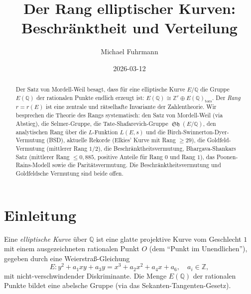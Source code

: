 \documentclass[12pt,a4paper]{amsart}
\theoremstyle{definition}
\theoremstyle{remark}
\newcommand{\Z}{\mathbb{Z}}
\newcommand{\Q}{\mathbb{Q}}
\DeclareMathOperator{\Sha}{\mathfrak{Sh}}
\begin{document}

\title{Der Rang elliptischer Kurven:\\
  Beschränktheit und Verteilung}

\author{Michael Fuhrmann}
\address{Specialist Mathematics Project, Build 167}
\date{2026-03-12}

\begin{abstract}
Der Satz von Mordell-Weil besagt, dass für eine elliptische Kurve $E/\Q$ die Gruppe
$E(\Q)$ der rationalen Punkte endlich erzeugt ist:
$E(\Q) \cong \Z^r \oplus E(\Q)_{\mathrm{tors}}$.
Der \emph{Rang} $r = r(E)$ ist eine zentrale und rätselhafte Invariante der
Zahlentheorie.
Wir besprechen die Theorie des Rangs systematisch: den Satz von Mordell-Weil (via
Abstieg), die Selmer-Gruppe, die Tate-Shafarevich-Gruppe $\Sha(E/\Q)$, den analytischen
Rang über die $L$-Funktion $L(E,s)$ und die Birch-Swinnerton-Dyer-Vermutung (BSD),
aktuelle Rekorde (Elkies' Kurve mit Rang $\geq 29$), die Goldfeld-Vermutung
(mittlerer Rang $1/2$), die Beschränktheitsver\-mutung, Bhargava-Shankars Satz
(mittlerer Rang $\leq 0{,}885$, positive Anteile für Rang $0$ und Rang $1$),
das Poonen-Rains-Modell sowie die Paritätsvermutung.
Die Beschränktheitsvermutung und Goldfeldsche Vermutung sind beide offen.
\end{abstract}

\maketitle

\tableofcontents

\section{Einleitung}

Eine \emph{elliptische Kurve} über $\Q$ ist eine glatte projektive Kurve vom Geschlecht
$1$ mit einem ausgezeichneten rationalen Punkt $O$ (dem ``Punkt im Unendlichen''),
gegeben durch eine Weierstraß-Gleichung
\[
  E\colon y^2 + a_1 xy + a_3 y = x^3 + a_2 x^2 + a_4 x + a_6, \quad a_i \in \Z,
\]
mit nicht-verschwindender Diskriminante.
Die Menge $E(\Q)$ der rationalen Punkte bildet eine abelsche Gruppe
(via das Sekanten-Tangenten-Gesetz).
\end{document}

